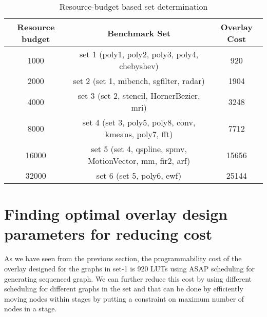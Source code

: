 \begin{table}[!h]
	\renewcommand{\arraystretch}{1.3}
	\caption{Resource-budget based set determination}
	\label{budgetset}
	\centering
	\scriptsize
	\begin{tabular}{ccc}
		\toprule
		Resource budget & Benchmark Set & Overlay Cost \\
		\midrule                                                                                  1000           & set 1 (poly1, poly2, poly3, poly4, chebyshev)    & 920                    \\
		2000                                       & set 2 (set 1, mibench, sgfilter, radar)                      & 1904                             \\                           
		4000                                       & set 3 (set 2, stencil, HornerBezier, mri)                  & 3248                                            \\
		8000                                       & set 4 (set 3, poly5, poly8, conv, kmeans, poly7, fft) & 7712 \\
		16000                                    & set 5 (set 4, qspline, spmv, MotionVector, mm, fir2, arf) & 15656\\
		32000                                    & set 6 (set 5, poly6, ewf)  & 25144                                                        \\
		\bottomrule                                                                             
		
	\end{tabular}
\end{table}






\section{Finding optimal overlay design parameters for reducing cost }
As we have seen from the previous section, the programmability cost of the overlay designed for the graphs in set-1 is 920 LUTs using ASAP scheduling for generating sequenced graph.
We can further reduce this cost by using different scheduling for different graphs in the set and that can be done by efficiently moving nodes within stages by putting a constraint on maximum number of nodes in a stage.

